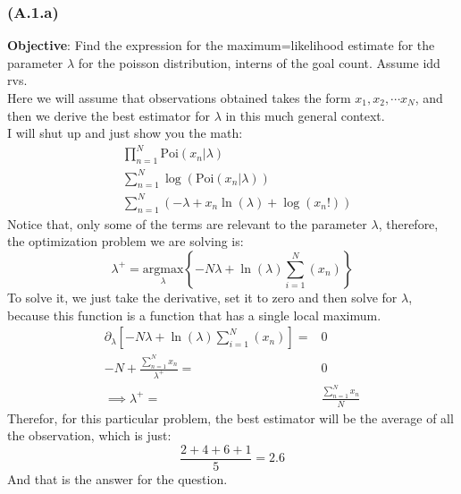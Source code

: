 \documentclass[]{article}
\begin{document}
        \subsubsection*{(A.1.a)}\label{A.1.a}
            \textbf{Objective}: Find the expression for the maximum=likelihood estimate for the parameter $\lambda$ for the poisson distribution, interns of the goal count. Assume idd rvs. 
            \\[1em]
            Here we will assume that observations obtained takes the form $x_1, x_2, \cdots x_N$, and then we derive the best estimator for $\lambda$ in this much general context. 
            \\[1em]
            I will shut up and just show you the math: 
            \begin{align*}\tag{A.1.a.1}\label{eqn:A.1.a.1}
                & 
                \prod_{n = 1}^{N} 
                \text{Poi}(x_n|\lambda)
                \\
                &
                \sum_{n = 1}^{N}
                \log\left(
                    \text{Poi}(x_n|\lambda)
                \right)
                \\
                &
                \sum_{n = 1}^{N}
                \left(
                    -\lambda + x_n\ln(\lambda) + \log(x_n!)
                \right)
            \end{align*}
            Notice that, only some of the terms are relevant to the parameter $\lambda$, therefore, the optimization problem we are solving is: 
            \begin{equation*}\tag{A.1.a.2}\label{eqn:A.1.a.2}
                \lambda^+ = 
                \underset{\lambda}{\text{argmax}}
                \left\lbrace
                    -N\lambda
                    +  
                    \ln(\lambda)
                    \sum_{i = 1}^{N}
                        \left(
                            x_n
                        \right)
                \right\rbrace
            \end{equation*}
            To solve it, we just take the derivative, set it to zero and then solve for $\lambda$, because this function is a function that has a single local maximum. 
            \begin{align*}\tag{A.1.a.3}\label{eqn:A.1.a.3}
                \partial_\lambda \left[
                -N\lambda
                +  
                \ln(\lambda)
                \sum_{i = 1}^{N}
                    \left(
                        x_n
                    \right)
                \right] =& 0
                \\
                -N + \frac{\sum_{n = 1}^{N}x_n}{
                \lambda^+
                } =& 0 
                \\
                \implies
                \lambda^+ =& \frac{\sum_{n = 1}^{N}x_n}{N}
            \end{align*}
            Therefor, for this particular problem, the best estimator will be the average of all the observation, which is just: 
            $$
                \frac{2 + 4 + 6 + 1}{5} = 2.6
            $$
            And that is the answer for the question. 
\end{document}
